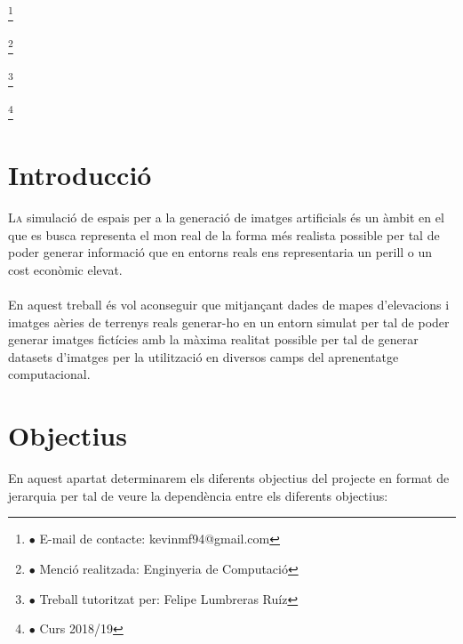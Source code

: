 \documentclass[10pt,a4paper,twocolumn,twoside]{article}
\newcommand\blfootnote[1]{%
  \begingroup
  \renewcommand\thefootnote{}\footnote{#1}%
  \addtocounter{footnote}{-1}%
  \endgroup
}
\begin{document}
\blfootnote{$\bullet$ E-mail de contacte: kevinmf94@gmail.com}
\blfootnote{$\bullet$ Menció realitzada: Enginyeria de Computació}
\blfootnote{$\bullet$ Treball tutoritzat per: Felipe Lumbreras Ruíz}
\blfootnote{$\bullet$ Curs 2018/19}

\vspace{-1cm}
\section{Introducció}

\lettrine[lines=2]{L}{a} simulació de espais per a la generació de imatges artificials és un àmbit en el que es busca representa el mon real de la forma més realista possible per tal de poder generar informació que en entorns reals ens representaria un perill o un cost econòmic elevat.
\\
\\
En aquest treball és vol aconseguir que mitjançant dades de mapes d'elevacions i imatges aèries de terrenys reals generar-ho en un entorn simulat per tal de poder generar imatges fictícies amb la màxima realitat possible per tal de generar datasets d'imatges per la utilització en diversos camps del aprenentatge computacional.

\section{Objectius}

En aquest apartat determinarem els diferents objectius del projecte en format de jerarquia per tal de veure la dependència entre els diferents objectius:
\end{document}
